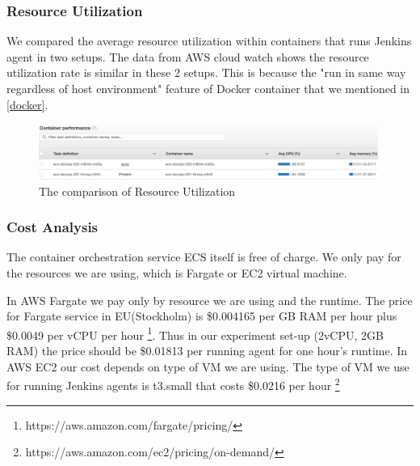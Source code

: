 \subsubsection{Resource Utilization}
We compared the average resource utilization within containers that runs Jenkins agent in two setups. The data from AWS cloud watch shows the resource utilization rate is similar in these 2 setups. This is because the "run in same way regardless of host environment" \cite{WhatisaC60:online} feature of Docker container that we mentioned in \ref{docker}.
\begin{figure}[h]
    \centering
    \includegraphics[width=0.99\textwidth]{pics/utilizationecs.png}
    \caption{The comparison of Resource Utilization}
    \label{fig:utilizationecs}
\end{figure}
\subsubsection{Cost Analysis}
The container orchestration service ECS itself is free of charge. We only pay for the resources we are using, which is Fargate or EC2 virtual machine.
\par
In AWS Fargate we pay only by resource we are using and the runtime. The price for Fargate service in EU(Stockholm) is \$0.004165 per GB RAM per hour plus \$0.0049 per vCPU per hour \footnote{https://aws.amazon.com/fargate/pricing/}. Thus in our experiment set-up (2vCPU, 2GB RAM) the price should be \$0.01813 per running agent for one hour's runtime.
In AWS EC2 our cost depends on type of VM we are using. The type of VM we use for running Jenkins agents is t3.small that costs \$0.0216 per hour \footnote{https://aws.amazon.com/ec2/pricing/on-demand/}
\par